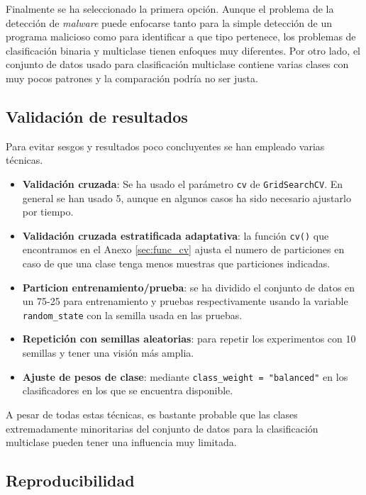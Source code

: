 \vspace{1em}

Finalmente se ha seleccionado la primera opción. Aunque el problema de la detección de \textit{malware} puede enfocarse tanto para la simple detección de un programa malicioso como para identificar a que tipo pertenece, los problemas de clasificación binaria y multiclase tienen enfoques muy diferentes. Por otro lado, el conjunto de datos usado para clasificación multiclase contiene varias clases con muy pocos patrones y la comparación podría no ser justa.

\newpage
\subsection{Validación de resultados}
\label{subsec:validaction}

Para evitar sesgos y resultados poco concluyentes se han empleado varias técnicas.

\begin{itemize}
	\item \textbf{Validación cruzada}: Se ha usado el parámetro \texttt{cv} de \texttt{GridSearchCV}. En general se han usado 5, aunque en algunos casos ha sido necesario ajustarlo por tiempo.
	\item \textbf{Validación cruzada estratificada adaptativa}: la función \texttt{cv()} que encontramos en el Anexo \ref{sec:func_cv} ajusta el numero de particiones en caso de que una clase tenga menos muestras que particiones indicadas.
	\item \textbf{Particion entrenamiento/prueba}: se ha dividido el conjunto de datos en un 75-25 para entrenamiento y pruebas respectivamente usando la variable \texttt{random\_state} con la semilla usada en las pruebas.
	\item \textbf{Repetición con semillas aleatorias}: para repetir los experimentos con 10 semillas y tener una visión más amplia.
	\item \textbf{Ajuste de pesos de clase}: mediante \texttt{class\_weight = "balanced"} en los clasificadores en los que se encuentra disponible.
\end{itemize}

A pesar de todas estas técnicas, es bastante probable que las clases extremadamente minoritarias del conjunto de datos para la clasificación multiclase pueden tener una influencia muy limitada.

\newpage
\subsection{Reproducibilidad}
\label{subsec:reproducibilidad}

